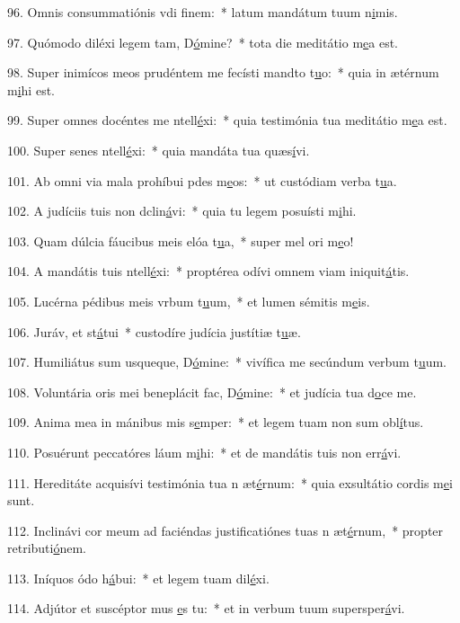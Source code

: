 96. Omnis consummatiónis vdi f\uline{i}nem:~* latum mandátum tuum n\uline{i}mis.\par 
97. Quómodo diléxi legem tam, D\uline{ó}mine?~* tota die meditátio m\uline{e}a est.\par 
98. Super inimícos meos prudéntem me fecísti mandto t\uline{u}o:~* quia in ætérnum m\uline{i}hi est.\par 
99. Super omnes docéntes me ntell\uline{é}xi:~* quia testimónia tua meditátio m\uline{e}a est.\par 
100. Super senes ntell\uline{é}xi:~* quia mandáta tua quæs\uline{í}vi.\par 
101. Ab omni via mala prohíbui pdes m\uline{e}os:~* ut custódiam verba t\uline{u}a.\par 
102. A judíciis tuis non dclin\uline{á}vi:~* quia tu legem posuísti m\uline{i}hi.\par 
103. Quam dúlcia fáucibus meis elóa t\uline{u}a,~* super mel ori m\uline{e}o!\par 
104. A mandátis tuis ntell\uline{é}xi:~* proptérea odívi omnem viam iniquit\uline{á}tis.\par 
105. Lucérna pédibus meis vrbum t\uline{u}um,~* et lumen sémitis m\uline{e}is.\par 
106. Juráv, et st\uline{á}tui~* custodíre judícia justítiæ t\uline{u}æ.\par 
107. Humiliátus sum usqueque, D\uline{ó}mine:~* vivífica me secúndum verbum t\uline{u}um.\par 
108. Voluntária oris mei beneplácit fac, D\uline{ó}mine:~* et judícia tua d\uline{o}ce me.\par 
109. Anima mea in mánibus mis s\uline{e}mper:~* et legem tuam non sum obl\uline{í}tus.\par 
110. Posuérunt peccatóres láum m\uline{i}hi:~* et de mandátis tuis non err\uline{á}vi.\par 
111. Hereditáte acquisívi testimónia tua n æt\uline{é}rnum:~* quia exsultátio cordis m\uline{e}i sunt.\par 
112. Inclinávi cor meum ad faciéndas justificatiónes tuas n æt\uline{é}rnum,~* propter retributi\uline{ó}nem.\par 
113. Iníquos ódo h\uline{á}bui:~* et legem tuam dil\uline{é}xi.\par 
114. Adjútor et suscéptor mus \uline{e}s tu:~* et in verbum tuum supersper\uline{á}vi.\par 
